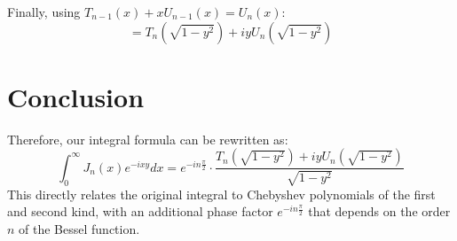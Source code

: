 \documentclass{article}
\begin{document}
Finally, using $T_{n-1}(x) + x U_{n-1}(x) = U_n(x)$:
\begin{equation}
  = T_n(\sqrt{1 - y^2}) + i y U_n(\sqrt{1 - y^2})
\end{equation}

\section{Conclusion}
Therefore, our integral formula can be rewritten as:
\begin{equation}
  \int_0^{\infty} J_n (x) e^{- ixy} dx = e^{-i n\frac{\pi}{2}} \cdot \frac{T_n (\sqrt{1 - y^2}) + i y U_n (\sqrt{1 - y^2})}{\sqrt{1 - y^2}}
\end{equation}
This directly relates the original integral to Chebyshev polynomials of the first and second kind, with an additional phase factor $e^{-i n\frac{\pi}{2}}$ that depends on the order $n$ of the Bessel function.
\end{document}
